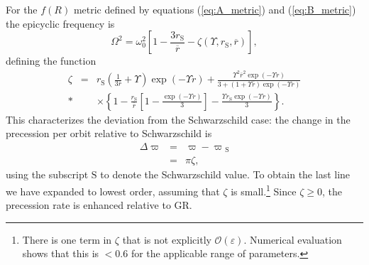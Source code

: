 \documentclass[aps,prd,amsfonts,amssymb,amsmath,nofootinbib,reprint,showpacs]{revtex4-1}
\newcommand{\eqnref}[1]{(\ref{eq:#1})}
\newcommand{\sub}[1]{\ensuremath{_\text{#1}}}
\newcommand{\recip}[1]{\ensuremath{\frac{1}{#1}}}
\newcommand{\order}[1]{\ensuremath{\mathcal{O}({#1})}}
\begin{document}
For the $f(R)$ metric defined by equations \eqnref{A_metric} and \eqnref{B_metric} the epicyclic frequency is
\begin{equation}
\Omega^2 = \omega_0^2 \left[1 - \frac{3r\sub{S}}{\overline{r}} - \zeta(\Upsilon,r\sub{S},\overline{r})\right],
\end{equation}
defining the function
\begin{eqnarray}
\zeta & = & r\sub{S}\left(\recip{3\overline{r}} + \Upsilon\right)\exp(-\Upsilon r) + \frac{\Upsilon^2\overline{r}^2\exp(-\Upsilon r)}{3 + (1 + \Upsilon \overline{r})\exp(-\Upsilon r)} \nonumber \\*
& &  \times \left\{1 - \frac{r\sub{S}}{\overline{r}}\left[1 - \frac{\exp(-\Upsilon r)}{3}\right] - \frac{\Upsilon r\sub{S}\exp(-\Upsilon r)}{3}\right\}.
\end{eqnarray}
This characterizes the deviation from the Schwarzschild case: the change in the precession per orbit relative to Schwarzschild is
\begin{eqnarray}
\Delta \varpi & = & \varpi - \varpi\sub{S} \\
 & = & \pi\zeta,
\end{eqnarray}
using the subscript $\text{S}$ to denote the Schwarzschild value. To obtain the last line we have expanded to lowest order, assuming that $\zeta$ is small.\footnote{There is one term in $\zeta$ that is not explicitly $\order{\varepsilon}$. Numerical evaluation shows that this is $< 0.6$ for the applicable range of parameters.} Since $\zeta \geq 0$, the precession rate is enhanced relative to GR.
\end{document}
